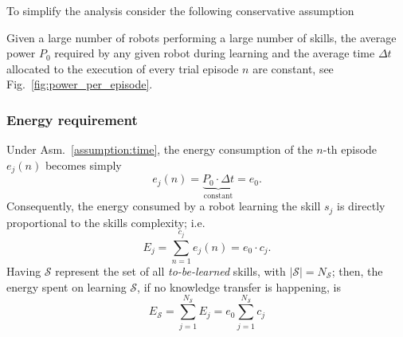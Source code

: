 To simplify the analysis consider the following conservative assumption
\begin{tcolorbox}
	\begin{assumption}\label{assumption:time}
		Given a large number of robots performing a large number of skills, the average power $P_0$ required by any given robot during learning and the average time $\Delta t$ allocated to the execution of every trial episode $n$ are constant, see Fig.~\ref{fig:power_per_episode}.
	\end{assumption}
\end{tcolorbox}
\subsubsection{\textbf{Energy requirement}}
Under Asm.~\ref{assumption:time}, the energy consumption of the $n$-th episode $e_j(n)$ becomes simply
\begin{equation}\label{eq:energy_per_episode}
    e_j(n) = \underbrace{P_0\cdot \Delta t}_{\text{constant}} = e_0.
\end{equation}
Consequently, the energy consumed by a robot learning the skill $ s_j $ is directly proportional to the skills complexity; i.e.
\begin{equation}\label{eq:energy_per_skill}
    E_j =\sum_{n=1}^{c_j} e_j(n) = e_0 \cdot c_j.
\end{equation}
Having $\mathcal{S}$ represent the set of all \emph{to-be-learned} skills, with $|\mathcal{S}| = N_\mathcal{S}$; then, the energy spent on learning $\mathcal{S}$, if no knowledge transfer is happening, is
\begin{equation}\label{eq:total_energy}
	E_{\mathcal{S}} = \sum_{j=1}^{{N_{\mathcal{S}}}} E_j = e_0 \sum_{j=1}^{{N_{\mathcal{S}}}} c_j%
\end{equation}
